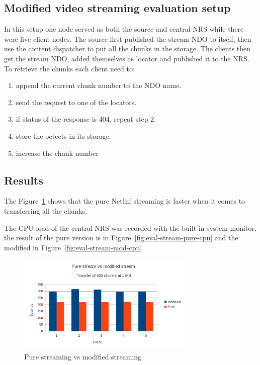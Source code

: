 \subsection{Modified video streaming evaluation setup}
In this setup one node served as both the source and central NRS while there were five client nodes. The source first published the stream NDO to itself, then use the content dispatcher to put all the chunks in the storage.
The clients then get the stream NDO, added themselves as locator and published it to the NRS. To retrieve the chunks each client need to:
\begin{enumerate}
\item append the current chunk number to the NDO name.
\item send the request to one of the locators.
\item if status of the response is 404, repeat step 2.
\item store the octects in its storage.
\item increase the chunk number
\end{enumerate}

\subsection{Results} 
The Figure~\ref{fig:eval-stream-modvspure} shows that the pure NetInf streaming is faster when it comes to transferring all the chunks. 

The CPU load of the central NRS was recorded with the built in system monitor, the result of the pure version is in Figure~\ref{fig:eval-stream-pure-cpu} and the modified in Figure~\ref{fig:eval-stream-mod-cpu}. 


\begin{figure}[h!]
	\centering
		\includegraphics[width=0.75\textwidth]{./img/eval-stream-plot-modvspure.png}
    	\caption{Pure streaming vs modified streaming}
	\label{fig:eval-stream-modvspure}
\end{figure}

